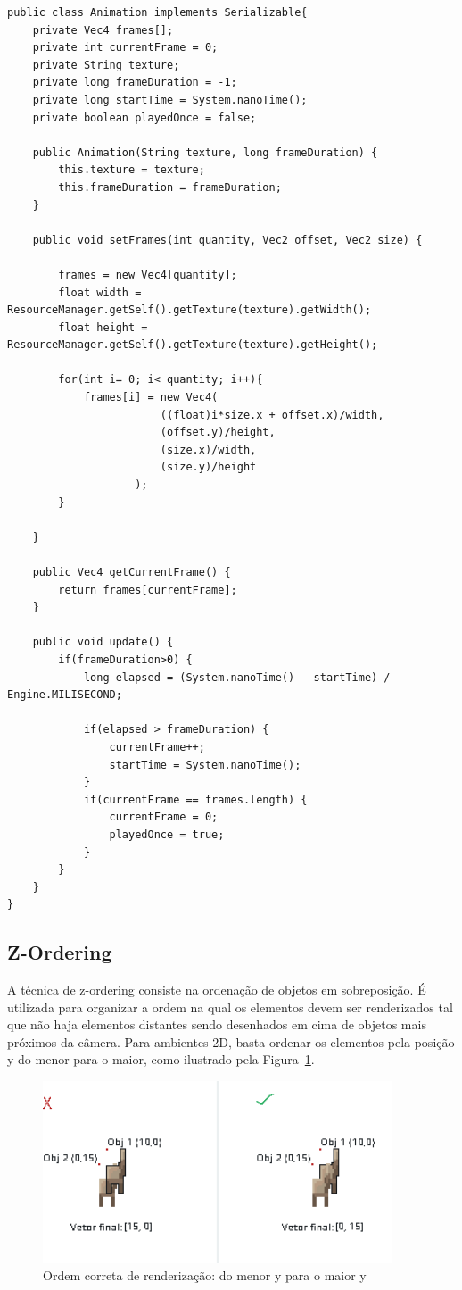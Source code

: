 \documentclass[12pt, 
openright, 
oneside, 
a4paper,    
brazil]{facom-ufu-abntex2}
\begin{document}
\begin{lstlisting}[caption=Classe Animation, label={alg:AnimationClass}]
public class Animation implements Serializable{
	private Vec4 frames[];
	private int currentFrame = 0;
	private String texture;
	private long frameDuration = -1;
	private long startTime = System.nanoTime();
	private boolean playedOnce = false;
	
	public Animation(String texture, long frameDuration) {
		this.texture = texture;
		this.frameDuration = frameDuration;
	}

	public void setFrames(int quantity, Vec2 offset, Vec2 size) {
	
		frames = new Vec4[quantity];
		float width = ResourceManager.getSelf().getTexture(texture).getWidth();
		float height = ResourceManager.getSelf().getTexture(texture).getHeight();
		
		for(int i= 0; i< quantity; i++){
			frames[i] = new Vec4(
						((float)i*size.x + offset.x)/width,
						(offset.y)/height,
						(size.x)/width,
						(size.y)/height
					);
		}
		
	}
	
	public Vec4 getCurrentFrame() {
		return frames[currentFrame];
	}
	
	public void update() {
		if(frameDuration>0) {
			long elapsed = (System.nanoTime() - startTime) / Engine.MILISECOND;
			
			if(elapsed > frameDuration) {
				currentFrame++;
				startTime = System.nanoTime();
			}
			if(currentFrame == frames.length) {
				currentFrame = 0;
				playedOnce = true;
			}
		}
	}
}
\end{lstlisting}
\subsection{Z-Ordering}
A técnica de z-ordering consiste na ordenação de objetos em sobreposição. É utilizada para organizar a ordem na qual os elementos devem ser renderizados tal que não haja elementos distantes sendo desenhados em cima de objetos mais próximos da câmera.
Para ambientes 2D, basta ordenar os elementos pela posição y do menor para o maior, como ilustrado pela Figura~\ref{fig:zOrder}.

\begin{figure}[H]
	\centering
	\includegraphics[width=28em]{imagens/z-order.png}
	\caption{Ordem correta de renderização: do menor y para o maior y}
	\label{fig:zOrder}
\end{figure}
\end{document}
